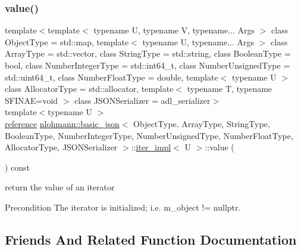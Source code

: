 \subsubsection{\texorpdfstring{value()}{value()}}
{\footnotesize\ttfamily template$<$template$<$ typename U, typename V, typename... Args $>$ class Object\+Type = std\+::map, template$<$ typename U, typename... Args $>$ class Array\+Type = std\+::vector, class String\+Type  = std\+::string, class Boolean\+Type  = bool, class Number\+Integer\+Type  = std\+::int64\+\_\+t, class Number\+Unsigned\+Type  = std\+::uint64\+\_\+t, class Number\+Float\+Type  = double, template$<$ typename U $>$ class Allocator\+Type = std\+::allocator, template$<$ typename T, typename S\+F\+I\+N\+A\+E=void $>$ class J\+S\+O\+N\+Serializer = adl\+\_\+serializer$>$ \\
template$<$typename U $>$ \\
\hyperlink{classnlohmann_1_1basic__json_1_1iter__impl_ae09599e9cb4a947020a0265c0c4f3d5e}{reference} \hyperlink{classnlohmann_1_1basic__json}{nlohmann\+::basic\+\_\+json}$<$ Object\+Type, Array\+Type, String\+Type, Boolean\+Type, Number\+Integer\+Type, Number\+Unsigned\+Type, Number\+Float\+Type, Allocator\+Type, J\+S\+O\+N\+Serializer $>$\+::\hyperlink{classnlohmann_1_1basic__json_1_1iter__impl}{iter\+\_\+impl}$<$ U $>$\+::value (\begin{DoxyParamCaption}{ }\end{DoxyParamCaption}) const\hspace{0.3cm}{\ttfamily [inline]}}



return the value of an iterator 

\begin{DoxyPrecond}{Precondition}
The iterator is initialized; i.\+e. {\ttfamily m\+\_\+object != nullptr}. 
\end{DoxyPrecond}


\subsection{Friends And Related Function Documentation}
\mbox{\label{classnlohmann_1_1basic__json_1_1iter__impl_ada3100cdb8700566051828f1355fa745}} 

